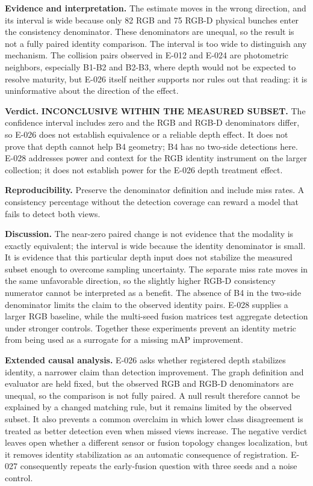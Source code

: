 \documentclass[preprint,12pt]{elsarticle}
\begin{document}
\textbf{Evidence and interpretation.} The estimate moves in the wrong
direction, and its interval is wide because only 82 RGB and 75 RGB-D physical
bunches enter the consistency denominator. These denominators are unequal, so
the result is not a fully paired identity comparison. The interval is too wide
to distinguish any mechanism. The collision pairs observed in E-012 and E-024
are photometric neighbors, especially B1-B2 and B2-B3, where depth would not
be expected to resolve maturity, but E-026 itself neither supports nor rules
out that reading: it is uninformative about the direction of the effect.

\textbf{Verdict.} \textbf{INCONCLUSIVE WITHIN THE MEASURED SUBSET.} The
confidence interval includes zero and the RGB and RGB-D denominators differ,
so E-026 does not establish equivalence or a reliable depth effect. It does
not prove that depth cannot help B4 geometry; B4 has no two-side detections
here. E-028 addresses power and context for the RGB identity instrument on the
larger collection; it does not establish power for the E-026 depth treatment
effect.

\textbf{Reproducibility.} Preserve the denominator definition and include
miss rates. A consistency percentage without the detection coverage can
reward a model that fails to detect both views.

\textbf{Discussion.} The near-zero paired change is not evidence that the
modality is exactly equivalent; the interval is wide because the identity
denominator is small. It is evidence that this particular depth input does
not stabilize the measured subset enough to overcome sampling uncertainty.
The separate miss rate moves in the same unfavorable direction, so the
slightly higher RGB-D consistency numerator cannot be interpreted as a
benefit. The absence of B4 in the two-side denominator limits the claim to
the observed identity pairs. E-028 supplies a larger RGB baseline, while the
multi-seed fusion matrices test aggregate detection under stronger controls.
Together these experiments prevent an identity metric from being used as a
surrogate for a missing mAP improvement.

\textbf{Extended causal analysis.} E-026 asks whether registered depth
stabilizes identity, a narrower claim than detection improvement. The graph
definition and evaluator are held fixed, but the observed RGB and RGB-D
denominators are unequal, so the comparison is not fully paired. A null result
therefore cannot be explained by a changed matching rule, but it remains
limited by the observed subset. It also prevents a common overclaim in
which lower class disagreement is treated as better detection even when missed
views increase. The negative verdict leaves open whether a different sensor
or fusion topology changes localization, but it removes identity stabilization
as an automatic consequence of registration. E-027 consequently repeats the
early-fusion question with three seeds and a noise control.
\end{document}
